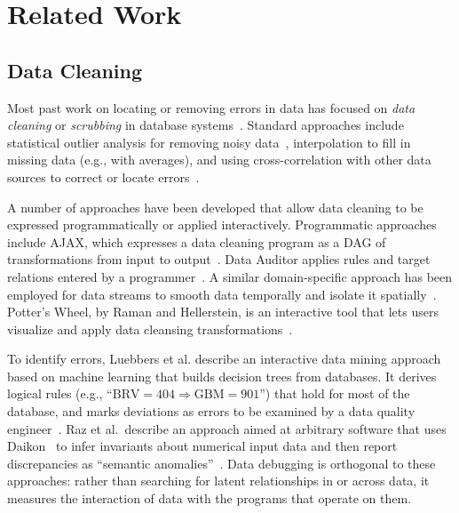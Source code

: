 \section{Related Work}


\subsection*{Data Cleaning}

Most past work on locating or removing errors in data has focused
on \emph{data cleaning} or \emph{scrubbing} in database
systems~\cite{DBLP:journals/debu/RahmD00,han2006data}. Standard
approaches include statistical outlier analysis for removing noisy
data~\cite{1583581}, interpolation to fill in missing data (e.g., with
averages), and using cross-correlation with other data sources to correct or
locate errors~\cite{Hernandez:1995:MPL:223784.223807}.




A number of approaches have been developed that allow data cleaning to
be expressed programmatically or applied interactively. Programmatic
approaches include AJAX, which expresses a data cleaning program as a
DAG of transformations from input to
output~\cite{Galhardas:2000:AED:342009.336568}. Data Auditor applies
rules and target relations entered by a
programmer~\cite{Golab:2010:DAE:1920841.1921060}. A similar
domain-specific approach has been employed for data streams to smooth
data temporally and isolate it spatially~\cite{1617508}. Potter's
Wheel, by Raman and Hellerstein, is an interactive tool that lets
users visualize and apply data cleansing
transformations~\cite{Raman:2001:PWI:645927.672045}.

To identify errors, Luebbers et al. describe an interactive data
mining approach based on machine learning that builds decision trees
from databases. It derives logical rules (e.g., ``$\mbox{BRV} =
404 \Rightarrow \mbox{GBM} = 901$'') that hold for most of the
database, and marks deviations as errors to be examined by a data
quality engineer~\cite{Luebbers:2003:SDD:1315451.1315499}. Raz et al.\
describe an approach aimed at arbitrary software that uses
Daikon~\cite{ernst2007daikon} to infer invariants about numerical
input data and then report discrepancies as ``semantic
anomalies''~\cite{Raz:2002:SAD:581339.581378}.  Data debugging is
orthogonal to these approaches: rather than searching for latent
relationships in or across data, it measures the interaction of data with
the programs that operate on them.

